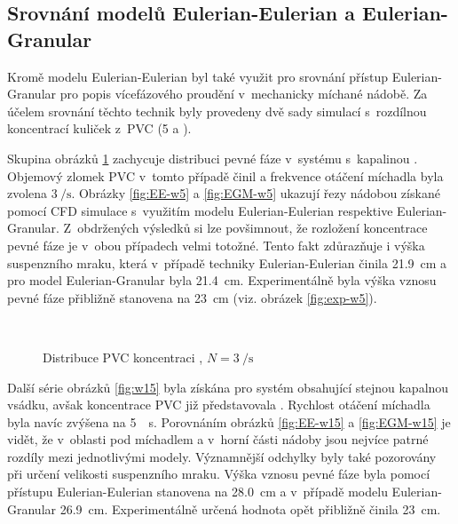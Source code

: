 \subsection{Srovnání modelů Eulerian-Eulerian a Eulerian-Granular}
Kromě modelu Eulerian-Eulerian byl také využit pro srovnání přístup Eulerian-Granular pro popis vícefázového proudění v~mechanicky míchané nádobě. Za účelem srovnání těchto technik byly provedeny dvě sady simulací s~rozdílnou koncentrací kuliček z~PVC (5 a ).

Skupina obrázků \ref{fig:w5} zachycuje distribuci pevné fáze v~systému s~kapalinou \pvpS{}. Objemový zlomek PVC v~tomto případě činil  a frekvence otáčení míchadla byla zvolena $\SI{3}{\per\second}$. Obrázky \ref{fig:EE-w5} a \ref{fig:EGM-w5} ukazují řezy nádobou získané pomocí CFD simulace s~využitím modelu Eulerian-Eulerian respektive Eulerian-Granular. Z~obdržených výsledků si lze povšimnout, že rozložení koncentrace pevné fáze je v~obou případech velmi totožné. Tento fakt zdůrazňuje i výška suspenzního mraku, která v~případě techniky Eulerian-Eulerian činila \SI{21.9}{\centi\meter} a pro model Eulerian-Granular byla \SI{21.4}{\centi\meter}. Experimentálně byla výška vznosu pevné fáze přibližně stanovena na \SI{23}{\centi\meter} (viz. obrázek \ref{fig:exp-w5}).

\begin{figure}[h!]
 \centering
  \qquad 
  \\
  \caption{Distribuce PVC koncentraci , $N=\SI{3}{\per\second}$}
  \label{fig:w5}
\end{figure}
Další série obrázků \ref{fig:w15} byla získána pro systém obsahující stejnou kapalnou vsádku, avšak koncentrace PVC již představovala . Rychlost otáčení míchadla byla navíc zvýšena na \SI{5}{\per\second}. Porovnáním obrázků \ref{fig:EE-w15} a \ref{fig:EGM-w15} je vidět, že v~oblasti pod míchadlem a v~horní části nádoby jsou nejvíce patrné rozdíly mezi jednotlivými modely. Významnější odchylky byly také pozorovány při určení velikosti suspenzního mraku. Výška vznosu pevné fáze byla pomocí přístupu Eulerian-Eulerian stanovena na \SI{28.0}{\centi\meter} a v~případě modelu Eulerian-Granular \SI{26.9}{\centi\meter}. Experimentálně určená hodnota opět přibližně činila \SI{23}{\centi\meter}. 

